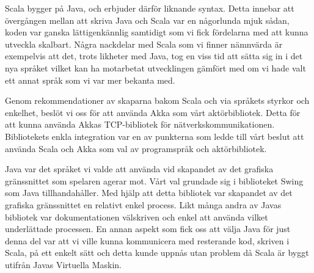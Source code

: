 \documentclass[a4paper]{article}
\begin{document}
Scala bygger på Java, och erbjuder därför liknande syntax. Detta innebar att övergången mellan att skriva Java och Scala var en någorlunda mjuk sådan, koden var ganska lättigenkännlig samtidigt som vi fick fördelarna med att kunna utveckla skalbart. Några nackdelar med Scala som vi finner nämnvärda är exempelvis att det, trots likheter med Java, tog en viss tid att sätta sig in i det nya 
språket vilket kan ha motarbetat utvecklingen gämfört med om vi hade valt ett annat språk som vi var mer bekanta med.

Genom rekommendationer av skaparna bakom Scala och via språkets styrkor och enkelhet, beslöt vi oss för 
att använda Akka som vårt aktörbibliotek. Detta för att kunna använda Akkas TCP-bibliotek för nätverkskommunikationen. Bibliotekets enkla integration var en av punkterna som ledde till vårt beslut att använda Scala och Akka som val av programspråk och aktörbibliotek.

Java var det språket vi valde att använda vid skapandet av det grafiska gränssnittet som spelaren agerar mot. Vårt val grundade sig i biblioteket Swing som Java tillhandahåller. 
Med hjälp att detta bibliotek var skapandet av det grafiska gränssnittet en relativt enkel process. Likt många andra av Javas bibliotek var dokumentationen välskriven och enkel 
att använda vilket underlättade processen. En annan aspekt som fick oss att välja Java för just denna del var att vi ville kunna kommunicera med resterande kod, skriven i Scala, 
på ett enkelt sätt och detta kunde uppnås utan problem då Scala är byggt utifrån Javas Virtuella Maskin. 
\end{document}
